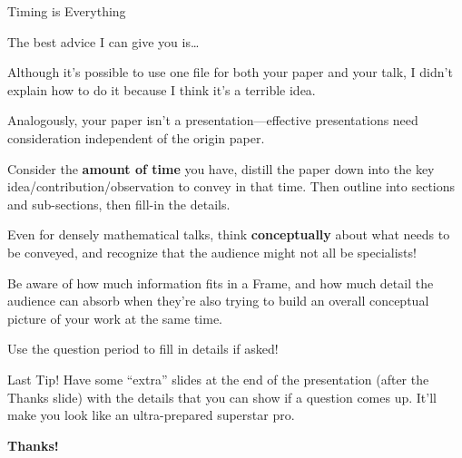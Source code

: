 \documentclass{beamer}
\begin{document}
\begin{frame}{Timing is Everything}

	The best advice I can give you is\dots \pause
	
	\begin{alertblock}{}
	\end{alertblock} 
	 
	\bigskip \pause
	
	Although it's possible to use one file for both your paper and your talk, I didn't explain how to do it because I think it's a \alert{terrible} idea.
	
	\medskip
	
	Analogously, your paper \alert{isn't} a presentation---effective presentations need consideration independent of the origin paper.
	
	\bigskip \pause
	
	Consider the \textbf{amount of time} you have, distill the paper down into the key idea/contribution/observation to convey in that time. Then outline into sections and sub-sections, then fill-in the details.
	
\end{frame}


\begin{frame}

	Even for densely mathematical talks, think \textbf{conceptually} about what needs to be conveyed, and recognize that the audience might not all be specialists!
	
	\bigskip
	
	Be aware of how much information fits in a Frame, and how much detail the audience can absorb when they're also trying to build an overall conceptual picture of your work at the same time.
	
	\bigskip
	
	Use the question period to fill in details if asked! \pause
	
	\begin{block}{Last Tip!}
		Have some ``extra'' slides at the end of the presentation (after the Thanks slide) with the details that you can show if a question comes up. It'll make you look like an ultra-prepared superstar pro.
	\end{block}

\end{frame}


\begin{frame}							%
	\centering
	{\Huge \bf Thanks!}
	
\end{frame}
\end{document}
